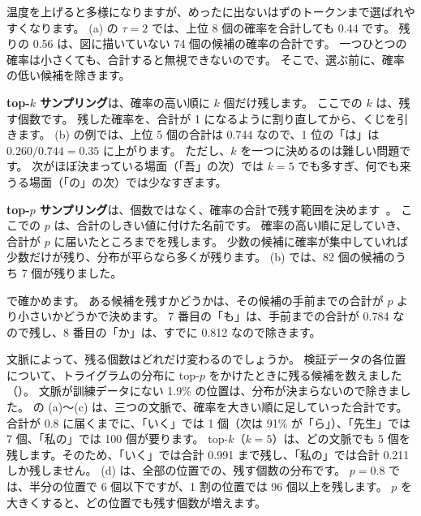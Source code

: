 温度を上げると多様になりますが、めったに出ないはずのトークンまで選ばれやすくなります。
(a) の $\tau=2$ では、上位 8 個の確率を合計しても 0.44 です。
残りの 0.56 は、図に描いていない 74 個の候補の確率の合計です。
一つひとつの確率は小さくても、合計すると無視できないのです。
そこで、選ぶ前に、確率の低い候補を除きます。

\textbf{top-$k$ サンプリング}は、確率の高い順に $k$ 個だけ残します。
ここでの $k$ は、残す個数です。
残した確率を、合計が 1 になるように割り直してから、くじを引きます。
(b) の例では、上位 5 個の合計は 0.744 なので、1 位の「は」は $0.260/0.744=0.35$ に上がります。
ただし、$k$ を一つに決めるのは難しい問題です。
次がほぼ決まっている場面（「吾」の次）では $k=5$ でも多すぎ、何でも来うる場面（「の」の次）では少なすぎます。

\textbf{top-$p$ サンプリング}は、個数ではなく、確率の合計で残す範囲を決めます~\cite{holtzman2020curious}。
ここでの $p$ は、合計のしきい値に付けた名前です。
確率の高い順に足していき、合計が $p$ に届いたところまでを残します。
少数の候補に確率が集中していれば少数だけが残り、分布が平らなら多くが残ります。
(b) では、82 個の候補のうち 7 個が残りました。

で確かめます。
ある候補を残すかどうかは、その候補の手前までの合計が $p$ より小さいかどうかで決めます。
7 番目の「も」は、手前までの合計が 0.784 なので残し、8 番目の「か」は、すでに 0.812 なので除きます。

文脈によって、残る個数はどれだけ変わるのでしょうか。
検証データの各位置について、トライグラムの分布に top-$p$ をかけたときに残る候補を数えました（）。
文脈が訓練データにない 1.9\% の位置は、分布が決まらないので除きました。
の (a)〜(c) は、三つの文脈で、確率を大きい順に足していった合計です。
合計が 0.8 に届くまでに、「いく」では 1 個（次は 91\% が「ら」）、「先生」では 7 個、「私の」では 100 個が要ります。
top-$k$（$k=5$）は、どの文脈でも 5 個を残します。そのため、「いく」では合計 0.991 まで残し、「私の」では合計 0.211 しか残しません。
(d) は、全部の位置での、残す個数の分布です。
$p=0.8$ では、半分の位置で 6 個以下ですが、1 割の位置では 96 個以上を残します。
$p$ を大きくすると、どの位置でも残す個数が増えます。

